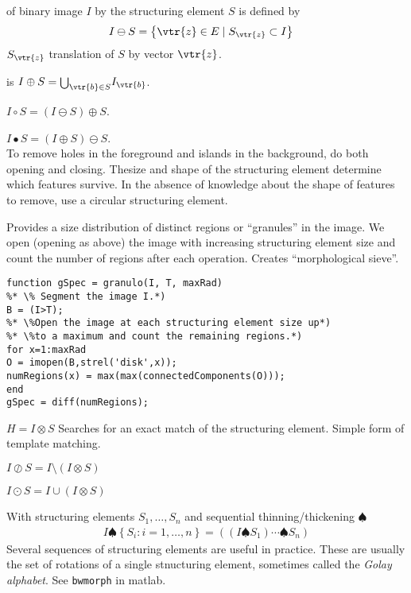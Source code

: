 \begin{compactdesc}
	\item[\lp{Erosion}] of binary image $I$ by the structuring element $S$ is defined by
		\begin{align*}
			I\ominus S&=\left\{ \vtr{z}\in E\mid S_{\vtr{z}}\subset I \right\}
		\end{align*}
			$S_{\vtr{z}}$ translation of $S$ by vector $\vtr{z}$.
	\item[\lp{Dilation}] is $I\oplus S={\scriptstyle\bigcup}_{\vtr{b}\in S}I_{\vtr{b}}$.
	\item[\lp{Opening}] $I\circ S=(I\ominus S)\oplus S$.
	\item[\lp{Closing}] $I\bullet S=(I\oplus S)\ominus S$.\\
		To remove holes in the foreground and islands in the background, do both opening and closing. Thesize and shape of the structuring element determine which features survive. In the absence of knowledge about the shape of features to remove, use a circular structuring element.
	\item[\lp{Granulometry}]
		Provides a size distribution of distinct regions or ``granules'' in the image. We open (opening as above) the image with increasing structuring element size and count the number of regions after each operation. Creates ``morphological sieve''.
		\begin{lstlisting}
function gSpec = granulo(I, T, maxRad)
%* \% Segment the image I.*)
B = (I>T);
%* \%Open the image at each structuring element size up*)
%* \%to a maximum and count the remaining regions.*)
for x=1:maxRad
O = imopen(B,strel('disk',x));
numRegions(x) = max(max(connectedComponents(O)));
end
gSpec = diff(numRegions);
		\end{lstlisting}
	\item[\lp{Hit-and-miss transform}] $H=I\otimes S$ Searches for an exact match of the structuring element. Simple form of template matching.
	\item[\lp{Thinning}] $I\oslash S=I\setminus (I\otimes S)$
	\item[\lp{Thickening}] $I\odot S=I\cup(I\otimes S)$
	\item[\lp{Sequential thinning/thickening}] With structuring elements $S_1,\ldots,S_n$ and sequential thinning/thickening $\spadesuit$
		\begin{gather*}
			I\spadesuit\left\{ S_i:i=1,\ldots,n \right\}=\left( \left(I\spadesuit S_1  \right) \cdots \spadesuit S_n \right)
		\end{gather*}
		Several sequences of structuring elements are useful in practice. These are usually the set of rotations of a single stnucturing element, sometimes called the \emph{Golay alphabet}. See \lstinline{bwmorph} in matlab.
\end{compactdesc}
